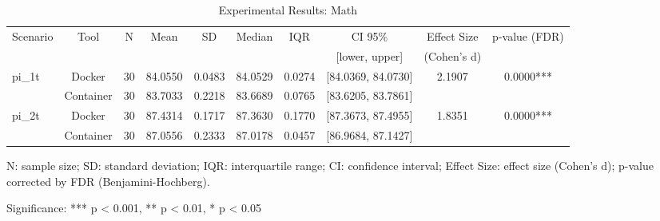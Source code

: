 \documentclass{article}
\begin{document}

\begin{table}[h]
\centering
\small
\caption{Experimental Results: Math}
\label{tab:math}
\begin{tabular}{lccccccccc}
\toprule
Scenario & Tool & N & Mean & SD & Median & IQR & CI 95\% & Effect Size & p-value (FDR) \\
 & & & & & & & [lower, upper] & (Cohen's d) & \\
\midrule
\multirow{2}{*}{pi\_1t} & Docker & 30 & 84.0550 & 0.0483 & 84.0529 & 0.0274 & [84.0369, 84.0730] & 2.1907 & 0.0000*** \\
 & Container & 30 & 83.7033 & 0.2218 & 83.6689 & 0.0765 & [83.6205, 83.7861] &  &  \\
\midrule
\multirow{2}{*}{pi\_2t} & Docker & 30 & 87.4314 & 0.1717 & 87.3630 & 0.1770 & [87.3673, 87.4955] & 1.8351 & 0.0000*** \\
 & Container & 30 & 87.0556 & 0.2333 & 87.0178 & 0.0457 & [86.9684, 87.1427] &  &  \\
\midrule
\bottomrule
\end{tabular}
\begin{tablenotes}
\small
\item N: sample size; SD: standard deviation; IQR: interquartile range; CI: confidence interval; Effect Size: effect size (Cohen's d); p-value corrected by FDR (Benjamini-Hochberg).
\item Significance: *** p < 0.001, ** p < 0.01, * p < 0.05
\end{tablenotes}
\end{table}
\end{document}
